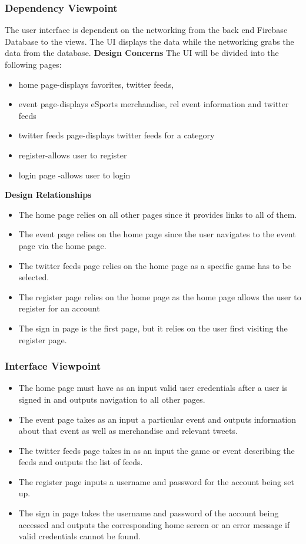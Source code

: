 \documentclass[onecolumn, draftclsnofoot,10pt, compsoc]{IEEEtran}
\begin{document}
        \subsubsection{Dependency Viewpoint}
        The user interface is dependent on the networking from the back end Firebase Database to the views. The UI displays the data while the networking grabs the data from the database.
        \textbf{Design Concerns}
        The UI will be divided into the following pages:
       \begin{itemize}
       \item home page-displays favorites, twitter feeds, 
       \item event page-displays eSports merchandise, rel event information and twitter feeds 
       \item twitter feeds page-displays twitter feeds for a category
       \item register-allows user to register
       \item login page -allows user to login 
       \end{itemize}
       \textbf{Design Relationships}
       \begin{itemize} 
       \item The home page relies on all other pages since it provides links to all of them. 
       \item The event page relies on the home page since the user navigates to the event page via the home page. 
       \item The twitter feeds page relies on the home page as a specific game has to be selected.
       \item The register page relies on the home page as the home page allows the user to register for an account 
       \item The sign in page is the first page, but it relies on the user first visiting the register page.
       \end{itemize}
   \subsubsection{Interface Viewpoint}
          \begin {itemize}
          \item The home page must have as an input valid user credentials after a user is signed in and outputs navigation to all other pages.
          \item The event page takes as an input a particular event and outputs information about that event as well as merchandise and relevant tweets.
          \item The twitter feeds page takes in as an input the game or event describing the feeds and outputs the list of feeds. 
          \item The register page inputs a username and password for the account being set up.
          \item The sign in page takes the username and password of the account being accessed and outputs the corresponding home screen or an error message if valid credentials cannot be found.
          \end {itemize} 
          
\end{document}

